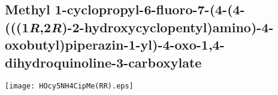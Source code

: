 %
%

%
%
%

\subsection{Methyl 1\hyp{}cyclopropyl\hyp{}6\hyp{}fluoro\hyp{}7\hyp{}(4\hyp{}(4\hyp{}(((1\textit{R},2\textit{R})\hyp{}2\hyp{}hydroxycyclopentyl)amin\allowbreak o)\hyp{}4\hyp{}oxobutyl)piperazin\hyp{}1\hyp{}yl)\hyp{}4\hyp{}oxo\hyp{}1,4\hyp{}dihydroquinoline\hyp{}3\hyp{}carboxylate }


\begin{scheme}[H]
	\begin{center}
		\texttt{[image: HOcy5NH4CipMe(RR).eps]}
	\end{center}
\end{scheme}

